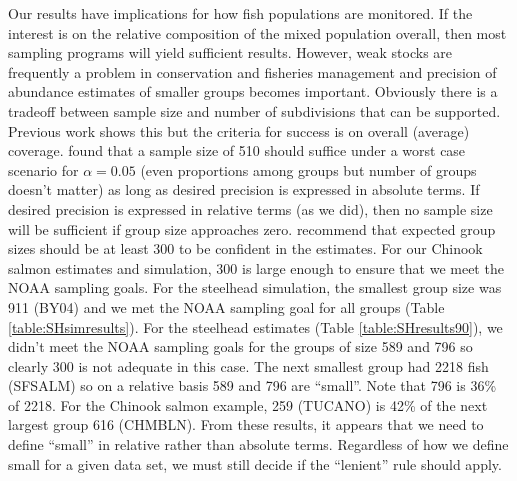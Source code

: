 \documentclass[%
                leqno,         %
%
]{nrc1}                          %
\begin{document}
Our results have implications for how fish populations are monitored. If the interest is on the relative composition of the  mixed population overall, then most sampling programs will yield sufficient results. However, weak stocks are frequently a problem in conservation and fisheries management and precision of abundance estimates of smaller groups becomes important.  Obviously there is a tradeoff between sample size and number of subdivisions that can be supported. Previous work \citep{Gerritsen} shows this but the criteria for success is on overall (average) coverage. \citet{Thompson1987} found that a sample size of 510 should suffice under a worst case scenario for $\alpha=0.05$ (even proportions among groups but number of groups doesn't matter) as long as desired precision is expressed in absolute terms. If desired precision is expressed in relative terms (as we did), then no sample size will be sufficient if group size approaches zero. \citet{Steinhorst2010} recommend that expected group sizes should be at least 300 to be confident in the estimates. For our Chinook salmon estimates and simulation, 300 is large enough to ensure that we meet the NOAA sampling goals.  For the steelhead simulation, the smallest group size was 911 (BY04) and we met the NOAA sampling goal for all groups (Table \ref{table:SHsimresults}).  For the steelhead estimates (Table \ref{table:SHresults90}), we didn't meet the NOAA sampling goals for the groups of size 589 and 796 so clearly 300 is not adequate in this case. The next smallest group had 2218 fish (SFSALM) so on a relative basis 589 and 796 are ``small''.  Note that 796 is 36\% of 2218.  For the Chinook salmon example, 259 (TUCANO) is 42\% of the next largest group 616 (CHMBLN).  From these results, it appears that we need to define ``small'' in relative rather than absolute terms.  Regardless of how we define small for a given data set, we must still decide if the ``lenient'' rule should apply.
\end{document}
